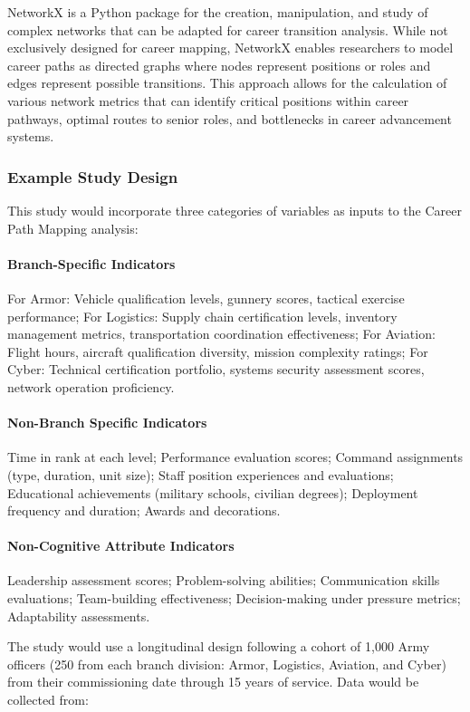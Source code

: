 \documentclass[../main.tex]{subfiles}
\begin{document}
NetworkX is a Python package for the creation, manipulation, and study of complex networks that can be adapted for career transition analysis. While not exclusively designed for career mapping, NetworkX enables researchers to model career paths as directed graphs where nodes represent positions or roles and edges represent possible transitions. This approach allows for the calculation of various network metrics that can identify critical positions within career pathways, optimal routes to senior roles, and bottlenecks in career advancement systems.

\subsubsection{Example Study Design}
This study would incorporate three categories of variables as inputs to the Career Path Mapping analysis:

\paragraph{Branch-Specific Indicators}
For Armor: Vehicle qualification levels, gunnery scores, tactical exercise performance; For Logistics: Supply chain certification levels, inventory management metrics, transportation coordination effectiveness; For Aviation: Flight hours, aircraft qualification diversity, mission complexity ratings; For Cyber: Technical certification portfolio, systems security assessment scores, network operation proficiency.

\paragraph{Non-Branch Specific Indicators}
Time in rank at each level; Performance evaluation scores; Command assignments (type, duration, unit size); Staff position experiences and evaluations; Educational achievements (military schools, civilian degrees); Deployment frequency and duration; Awards and decorations.

\paragraph{Non-Cognitive Attribute Indicators}
Leadership assessment scores; Problem-solving abilities; Communication skills evaluations; Team-building effectiveness; Decision-making under pressure metrics; Adaptability assessments.

The study would use a longitudinal design following a cohort of 1,000 Army officers (250 from each branch division: Armor, Logistics, Aviation, and Cyber) from their commissioning date through 15 years of service. Data would be collected from:
\end{document}
